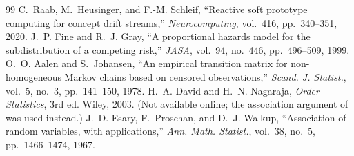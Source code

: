 \documentclass[10pt,a4paper]{article}
\begin{document}
{\begin{thebibliography}{99}
 C.~Raab, M.~Heusinger, and F.-M. Schleif, ``Reactive soft prototype computing for concept drift streams,'' \emph{Neurocomputing}, vol.~416, pp.~340--351, 2020.
 J.~P. Fine and R.~J. Gray, ``A proportional hazards model for the subdistribution of a competing risk,'' \emph{JASA}, vol.~94, no.~446, pp.~496--509, 1999.
 O.~O. Aalen and S.~Johansen, ``An empirical transition matrix for non-homogeneous Markov chains based on censored observations,'' \emph{Scand. J. Statist.}, vol.~5, no.~3, pp.~141--150, 1978.
 H.~A. David and H.~N. Nagaraja, \emph{Order Statistics}, 3rd ed. Wiley, 2003. (Not available online; the association argument of~\cite{esary1967} was used instead.)
 J.~D. Esary, F.~Proschan, and D.~J. Walkup, ``Association of random variables, with applications,'' \emph{Ann. Math. Statist.}, vol.~38, no.~5, pp.~1466--1474, 1967.
\end{thebibliography}
}
\end{document}
